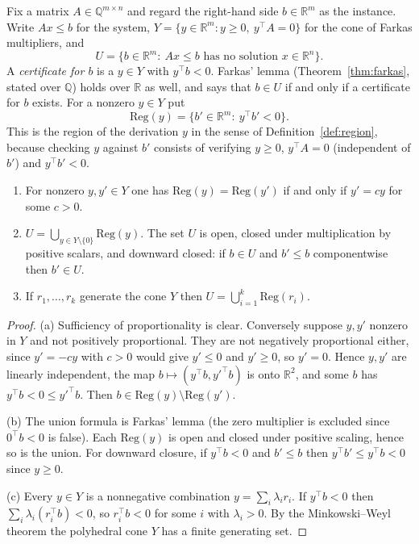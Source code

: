 Fix a matrix $A\in\mathbb{Q}^{m\times n}$ and regard the right-hand side $b\in\mathbb{R}^m$ as the instance. Write $Ax\le b$ for the system, $Y=\{y\in\mathbb{R}^m:y\ge0,\ y^{\top}A=0\}$ for the cone of Farkas multipliers, and
\[
U=\{b\in\mathbb{R}^m:\ Ax\le b\text{ has no solution } x\in\mathbb{R}^n\}.
\]
A \emph{certificate for $b$} is a $y\in Y$ with $y^{\top}b<0$. Farkas' lemma (Theorem~\ref{thm:farkas}, stated over $\mathbb{Q}$) holds over $\mathbb{R}$ as well, and says that $b\in U$ if and only if a certificate for $b$ exists. For a nonzero $y\in Y$ put
\[
\mathrm{Reg}(y)=\{b'\in\mathbb{R}^m:\ y^{\top}b'<0\}.
\]
This is the region of the derivation $y$ in the sense of Definition~\ref{def:region}, because checking $y$ against $b'$ consists of verifying $y\ge0$, $y^{\top}A=0$ (independent of $b'$) and $y^{\top}b'<0$.

\begin{theorem}
\label{thm:farkas-geom}
\leavevmode
\begin{enumerate}[label=(\alph*),nosep]
\item For nonzero $y,y'\in Y$ one has $\mathrm{Reg}(y)=\mathrm{Reg}(y')$ if and only if $y'=cy$ for some $c>0$.
\item $U=\bigcup_{y\in Y\setminus\{0\}}\mathrm{Reg}(y)$. The set $U$ is open, closed under multiplication by positive scalars, and downward closed: if $b\in U$ and $b'\le b$ componentwise then $b'\in U$.
\item If $r_1,\dots,r_k$ generate the cone $Y$ then $U=\bigcup_{i=1}^k\mathrm{Reg}(r_i)$.
\end{enumerate}
\end{theorem}

\begin{proof}
(a) Sufficiency of proportionality is clear. Conversely suppose $y,y'$ nonzero in $Y$ and not positively proportional. They are not negatively proportional either, since $y'=-cy$ with $c>0$ would give $y'\le0$ and $y'\ge0$, so $y'=0$. Hence $y,y'$ are linearly independent, the map $b\mapsto(y^{\top}b,y'^{\top}b)$ is onto $\mathbb{R}^2$, and some $b$ has $y^{\top}b<0\le y'^{\top}b$. Then $b\in\mathrm{Reg}(y)\setminus\mathrm{Reg}(y')$.

(b) The union formula is Farkas' lemma (the zero multiplier is excluded since $0^{\top}b<0$ is false). Each $\mathrm{Reg}(y)$ is open and closed under positive scaling, hence so is the union. For downward closure, if $y^{\top}b<0$ and $b'\le b$ then $y^{\top}b'\le y^{\top}b<0$ since $y\ge0$.

(c) Every $y\in Y$ is a nonnegative combination $y=\sum_i\lambda_ir_i$. If $y^{\top}b<0$ then $\sum_i\lambda_i(r_i^{\top}b)<0$, so $r_i^{\top}b<0$ for some $i$ with $\lambda_i>0$. By the Minkowski--Weyl theorem  the polyhedral cone $Y$ has a finite generating set.
\end{proof}

